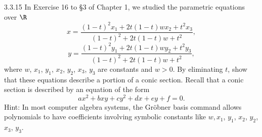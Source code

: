 \documentclass[twoside]{article}
\begin{document}
\newpage

\begin{ejercicio}{3.3.15}
In Exercise 16 to §3 of Chapter 1, we studied the parametric equations over $\R$
\[x =
\frac{(1 − t)^2x_1 + 2t(1 − t)wx_2 + t^2x_3}{
(1 − t)^2 + 2t(1 − t)w + t^2 } ,\]
\[y =
\frac{(1 − t)^2y_1 + 2t(1 − t)wy_2 + t^2y_3}{
(1 − t)^2 + 2t(1 − t)w + t^2} ,\]
where $w$, $x_1$, $y_1$, $x_2$, $y_2$, $x_3$, $y_3$ are constants and $w > 0$. By eliminating $t$, show that these
equations describe a portion of a conic section. Recall that a conic section is described
by an equation of the form
\[ax^2 + bxy + cy^2 + dx + ey + f = 0.\]
Hint: In most computer algebra systems, the Gröbner basis command allows polynomials
to have coefficients involving symbolic constants like $w, x_1$, $y_1$, $x_2$, $y_2$, $x_3$, $y_3$.
\end{ejercicio}
\begin{solucion}
\end{solucion}
\end{document}
